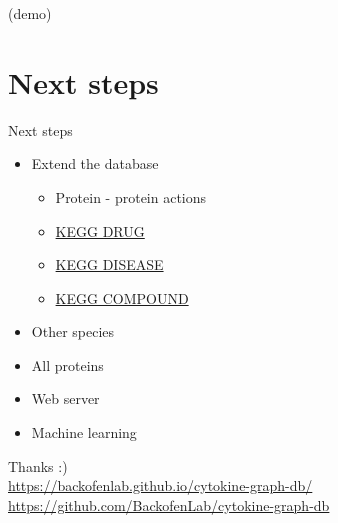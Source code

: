 \documentclass{beamer}
\begin{document}

\begin{frame}
\centering
\huge{(demo)}
\end{frame}

\section{Next steps}
\begin{frame}{Next steps}
\begin{itemize}
    \item Extend the database
    \begin{itemize}
        \item Protein - protein actions
        \item \href{https://www.genome.jp/kegg/drug/}{KEGG DRUG}
        \item \href{https://www.genome.jp/kegg/disease/}{KEGG DISEASE}
        \item \href{https://www.genome.jp/kegg/compound/}{KEGG COMPOUND}
    \end{itemize}
    \vfill
    \item Other species
    \vfill
    \item All proteins
    \vfill
    \item Web server
    \vfill
    \item Machine learning
\end{itemize}
\end{frame}

\begin{frame}
\centering
\huge{Thanks :)}
\bigskip \\
\small{
    \href{https://backofenlab.github.io/cytokine-graph-db/}{https://backofenlab.github.io/cytokine-graph-db/} \\
    \href{https://github.com/BackofenLab/cytokine-graph-db}{https://github.com/BackofenLab/cytokine-graph-db}
}
\end{frame}
\end{document}
